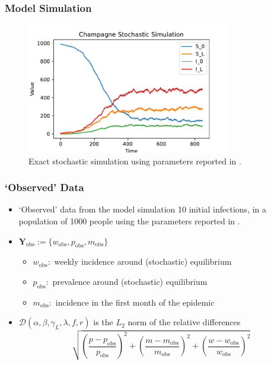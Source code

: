 \documentclass{beamer}
\begin{document}

\begin{frame}
    \frametitle{Model Simulation}
    \begin{figure}
        \centering
        \includegraphics[width=0.8\textwidth]{
            ../../champagne_GP_images/champagne_simulation.pdf
        }
        \caption{
            Exact stochastic simulation using parameters reported in
            \cite{champagne_using_2022}.
        }
    \end{figure}
\end{frame}

\begin{frame}
    \frametitle{`Observed' Data}
    \begin{itemize}
        \item `Observed' data from the model simulation 10 initial infections,
              in a population of 1000 people using the parameters reported in
              \cite{champagne_using_2022}.
        \item $\mathbf{Y}_\text{obs} := \{w_\text{obs}, p_\text{obs}, m_\text{obs}\}$
              \begin{itemize}
                  \item $w_\text{obs}:$ weekly incidence around (stochastic) equilibrium
                  \item $p_\text{obs}:$ prevalence around (stochastic) equilibrium
                  \item $m_\text{obs}:$ incidence in the first month of the epidemic
              \end{itemize}
        \item <3-> $
                  \mathcal{D}(\alpha, \beta, \gamma_L, \lambda, f, r)$ is the
              $L_2$ norm of the relative differences
              $$
                  \sqrt{
                      \left(\frac{p - p_\text{obs}}{p_\text{obs}}\right)^2
                      + \left(\frac{m - m_\text{obs}}{m_\text{obs}}\right)^2
                      + \left(\frac{w - w_\text{obs}}{w_\text{obs}}\right)^2
                  }
              $$
    \end{itemize}
\end{frame}
\end{document}
